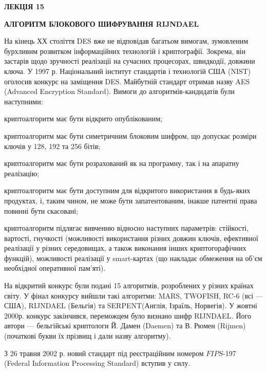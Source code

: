 {{{{{{{{{{{{{{{{{{\begin{definition}
{{{{{{{{\bigskip


\bigskip


\bigskip

{\bfseries
ЛЕКЦІЯ  15}


\bigskip

{\centering\bfseries
АЛГОРИТМ  БЛОКОВОГО  ШИФРУВАННЯ  RIJNDAEL
\par}


\bigskip


\bigskip

На кінець ХХ століття DES вже не відповідав багатьом вимогам, зумовленим
бурхливим розвитком інформаційних технологій і криптографії. Зокрема, він
застарів щодо зручності реалізації на сучасних процесорах, швидкодії, довжини
ключа. У 1997 р. Національний інститут стандартів і технологій США (NIST)
оголосив конкурс на заміщення DES. Майбутній стандарт отримав назву AES
(Advanced Encryption Standard). Вимоги до алгоритмів-кандидатів були
наступними:

\liststyleWWviiiNumxxvi
\beginitemize}
\item криптоалгоритм має бути відкрито опублікованим;
\item криптоалгоритм має бути симетричним блоковим шифром,  що допускає розміри
ключів у 128, 192 та 256 бітів;
\item криптоалгоритм має бути розрахований як на програмну, так і на апаратну
реалізацію;
\item криптоалгоритм має бути доступним для відкритого використання в будь-яких
продуктах, і, таким чином, не може бути запатентованим, інакше патентні права
повинні бути скасовані;
\item криптоалгоритм підлягає вивченню відносно наступних параметрів: стійкості,
вартості, гнучкості (можливості використання різних довжин ключів, ефективної
реалізації у різних середовищах, а також виконання інших криптогорафічних
функцій), можливості реалізації у smart{}-картах (що накладає обмеження на
об’єм необхідної оперативної пам’яті).
\enditemize}
На відкритий конкурс були подані 15 алгоритмів, розроблених у різних країнах
світу. У фінал конкурсу вийшли такі алгоритми: MARS, TWOFISH, RC{}-6 (всі ---
США), RIJNDAEL (Бельгія) та SERPENT(Англія, Ізраїль, Норвегія). У
жовтні 2000р. конкурс закінчився, переможцем було визнано шифр
RIJNDAEL\textit{.} Його автори --- бельгійські криптологи Й. Дамен (Daemen) та В.
Рюмен (Rijmen) (початкові букви їх прізвищ і дали назву алгоритму). 

З 26 травня 2002 р. новий стандарт під реєстраційним номером 
$FIPS$-197 (Federal Information Processing Standard) вступив у силу.


}}}}}}
\end{definition}}}}}}}}}}}}}}}}}}}
